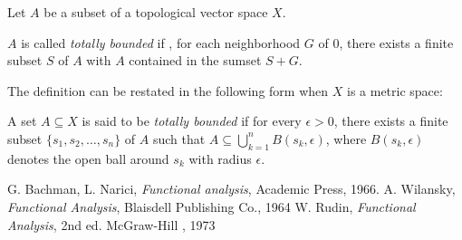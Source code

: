 \documentclass[12pt]{article}
\begin{document}
Let $A$ be a subset of a topological vector space $X$.

$A$ is called \emph{totally bounded} if , for each neighborhood $G$ of 0,
there exists a finite subset $S$ of $A$ with $A$ contained in the sumset $S + G$.

The definition can be restated in the following form when $X$ is a metric space:

A set $A \subseteq X$ is said to be {\em totally bounded} if  for every $\epsilon>0$, there exists a finite subset $\{s_1,s_2,\ldots ,s_n\}$ of $A$ such that $A\subseteq \bigcup _{k=1} ^n B(s_k,\epsilon )$, where $B(s_k,\epsilon)$ denotes the open ball around $s_k$ with radius $\epsilon$.


 

\begin{thebibliography}{9}
 G. Bachman, L. Narici, \emph{Functional analysis}, Academic Press, 1966.
 A. Wilansky, \emph{Functional Analysis}, Blaisdell Publishing Co., 1964
 W. Rudin, \emph{Functional Analysis}, 2nd ed. McGraw-Hill , 1973
\end{thebibliography}

\end{document}
